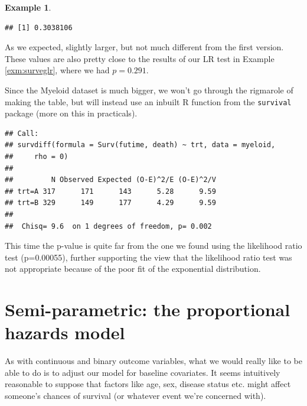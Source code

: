\documentclass[
  openany]{book}
\newenvironment{Shaded}{\begin{snugshade}}{\end{snugshade}}
\newcommand{\AttributeTok}[1]{\textcolor[rgb]{0.13,0.29,0.53}{#1}}
\newcommand{\DecValTok}[1]{\textcolor[rgb]{0.00,0.00,0.81}{#1}}
\newcommand{\FunctionTok}[1]{\textcolor[rgb]{0.13,0.29,0.53}{\textbf{#1}}}
\newcommand{\NormalTok}[1]{#1}
\newcommand{\OtherTok}[1]{\textcolor[rgb]{0.56,0.35,0.01}{#1}}
\newcommand{\SpecialCharTok}[1]{\textcolor[rgb]{0.81,0.36,0.00}{\textbf{#1}}}
\theoremstyle{definition}
\theoremstyle{definition}
\newtheorem{example}{Example}[chapter]
\theoremstyle{definition}
\theoremstyle{definition}
\theoremstyle{remark}
\begin{document}
\begin{example}
\begin{verbatim}
## [1] 0.3038106
\end{verbatim}

As we expected, slightly larger, but not much different from the first version. These values are also pretty close to the results of our LR test in Example \ref{exm:surveglr}, where we had \(p=0.291\).

Since the Myeloid dataset is much bigger, we won't go through the rigmarole of making the table, but will instead use an inbuilt R function from the \texttt{survival} package (more on this in practicals).

\begin{Shaded}
\end{Shaded}

\begin{verbatim}
## Call:
## survdiff(formula = Surv(futime, death) ~ trt, data = myeloid, 
##     rho = 0)
## 
##         N Observed Expected (O-E)^2/E (O-E)^2/V
## trt=A 317      171      143      5.28      9.59
## trt=B 329      149      177      4.29      9.59
## 
##  Chisq= 9.6  on 1 degrees of freedom, p= 0.002
\end{verbatim}

This time the p-value is quite far from the one we found using the likelihood ratio test (p=0.00055), further supporting the view that the likelihood ratio test was not appropriate because of the poor fit of the exponential distribution.
\end{example}

\section{Semi-parametric: the proportional hazards model}\label{semi-parametric-the-proportional-hazards-model}

As with continuous and binary outcome variables, what we would really like to be able to do is to adjust our model for baseline covariates. It seems intuitively reasonable to suppose that factors like age, sex, disease status etc. might affect someone's chances of survival (or whatever event we're concerned with).
\end{document}
